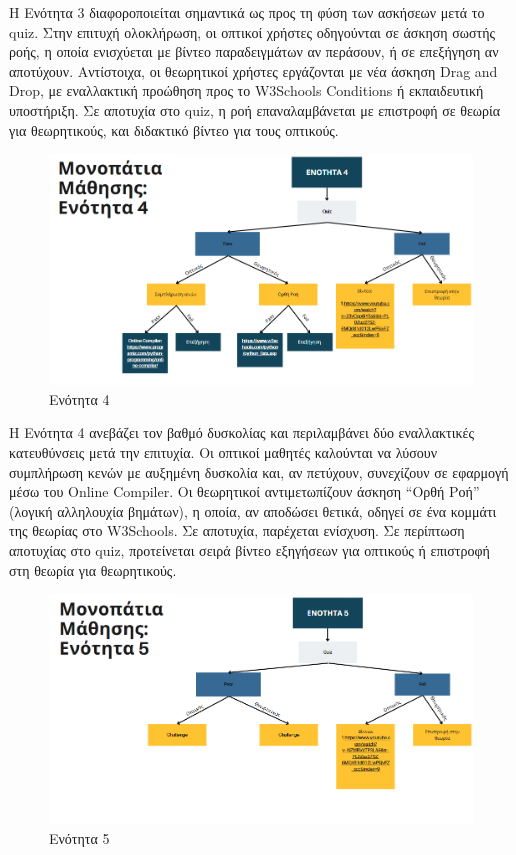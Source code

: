 \documentclass[11pt]{report}
\begin{document}
Η Ενότητα 3 διαφοροποιείται σημαντικά ως προς τη φύση των ασκήσεων μετά το quiz. Στην επιτυχή ολοκλήρωση, οι οπτικοί χρήστες οδηγούνται σε άσκηση σωστής ροής, η οποία ενισχύεται με βίντεο παραδειγμάτων αν περάσουν, ή σε επεξήγηση αν αποτύχουν. Αντίστοιχα, οι θεωρητικοί χρήστες εργάζονται με νέα άσκηση Drag and Drop, με εναλλακτική προώθηση προς το W3Schools Conditions ή εκπαιδευτική υποστήριξη. Σε αποτυχία στο quiz, η ροή επαναλαμβάνεται με επιστροφή σε θεωρία για θεωρητικούς, και διδακτικό βίντεο για τους οπτικούς. 

\begin{figure}[H]
    \centering
    \includegraphics[width=0.9\linewidth]{Figures/image009.png}
    \caption{Ενότητα 4}
    \label{fig:enter-label}
\end{figure}

Η Ενότητα 4 ανεβάζει τον βαθμό δυσκολίας και περιλαμβάνει δύο εναλλακτικές κατευθύνσεις μετά την επιτυχία. Οι οπτικοί μαθητές καλούνται να λύσουν συμπλήρωση κενών με αυξημένη δυσκολία και, αν πετύχουν, συνεχίζουν σε εφαρμογή μέσω του Online Compiler. Οι θεωρητικοί αντιμετωπίζουν άσκηση “Ορθή Ροή” (λογική αλληλουχία βημάτων), η οποία, αν αποδώσει θετικά, οδηγεί σε ένα κομμάτι της θεωρίας στο W3Schools. Σε αποτυχία, παρέχεται ενίσχυση. Σε περίπτωση αποτυχίας στο quiz, προτείνεται σειρά βίντεο εξηγήσεων για οπτικούς ή επιστροφή στη θεωρία για θεωρητικούς. 

\begin{figure}[H]
    \centering
    \includegraphics[width=0.9\linewidth]{Figures/image010.png}
    \caption{Ενότητα 5}
    \label{fig:enter-label}
\end{figure}
\end{document}
